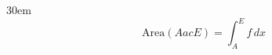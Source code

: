 \documentclass[border=4pt]{standalone}
\begin{document}
\begin{varwidth}{30em}
\large
\[ \text{Area}(AacE)=\int_{A}^{E} f\,dx \]

\end{varwidth}
\end{document}
